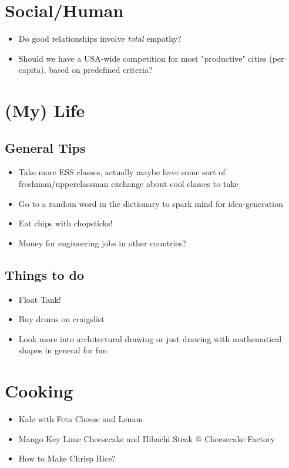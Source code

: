 \documentclass{amsart}
\begin{document}
\section{Social/Human}
\begin{itemize}
\item{Do good relationships involve {\it total} empathy?}
\item{Should we have a USA-wide competition for most "productive" cities (per capita), based on predefined criteria?}
\end{itemize}

\section{(My) Life}
\subsection{General Tips}
\begin{itemize}
\item{Take more ESS classes, actually maybe have some sort of freshman/upperclassman exchange about cool classes to take}
\item{Go to a random word in the dictionary to spark mind for idea-generation}
\item{Eat chips with chopsticks!}
\item{Money for engineering jobs in other countries?}
\end{itemize}
\subsection{Things to do}
\begin{itemize}
\item{Float Tank!}
\item{Buy drums on craigslist}
\item{Look more into architectural drawing or just drawing with mathematical shapes in general for fun}
\end{itemize}

\section{Cooking}
\begin{itemize}
\item{Kale with Feta Cheese and Lemon}
\item{Mango Key Lime Cheesecake and Hibachi Steak @ Cheesecake Factory}
\item{How to Make Chrisp Rice?}
\end{itemize}
\end{document}
